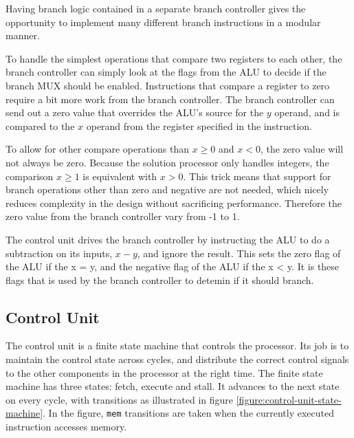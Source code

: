 Having branch logic contained in a separate branch controller gives the opportunity to implement many different branch instructions in a modular manner.

To handle the simplest operations that compare two registers to each other, the branch controller can simply look at the flags from the ALU to decide if the branch MUX should be enabled.
Instructions that compare a register to zero require a bit more work from the branch controller.
The branch controller can send out a zero value that overrides the ALU's source for the $ y $ operand, and is compared to the $ x $ operand from the register specified in the instruction.

To allow for other compare operations than $x \geq 0$ and $x < 0$, the zero value will not always be zero. 
Because the solution processor only handles integers, the comparison $ x \geq 1 $ is equivalent with $ x > 0 $.
This trick means that support for branch operations other than zero and negative are not needed, which nicely reduces complexity in the design without sacrificing performance.
Therefore the zero value from the branch controller vary from -1 to 1.

The control unit drives the branch controller by instructing the ALU to do a subtraction on its inputs, $ x - y $, and ignore the result.
This sets the zero flag of the ALU if the x = y, and the negative flag of the ALU if the x < y.
It is these flags that is used by the branch controller to detemin if it should branch.

\subsection{Control Unit}

The control unit is a finite state machine that controls the processor.
Its job is to maintain the control state across cycles, and distribute the correct control signals to the other components in the processor at the right time.
The finite state machine has three states: fetch, execute and stall.
It advances to the next state on every cycle, with transitions as illustrated in figure \ref{figure:control-unit-state-machine}.
In the figure, \texttt{mem} transitions are taken when the currently executed instruction accesses memory.

